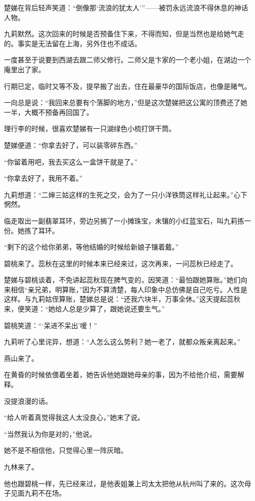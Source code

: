 \par 楚娣在背后轻声笑道：“倒像那‘流浪的犹太人’”——被罚永远流浪不得休息的神话人物。
\par 九莉默然。这次回来的时候是否预备住下来，不得而知，但是当然也是给她气走的。事实是无法留在上海，另外住也不成话。
\par 一度甚至于说要到西湖去跟二师父修行。二师父是卞家的一个老小姐，在湖边一个庵里出了家。
\par 行期已定，临时又等不及，提早搬了出去，住在最豪华的国际饭店，也像是赌气。
\par 一向总是说：“我回来总要有个落脚的地方，”但是这次楚娣把这公寓的顶费还了她一半，大概不预备再回国了。
\par 理行李的时候，很喜欢楚娣有一只湖绿色小梳打饼干筒。
\par 楚娣便道：“你拿去好了，可以装零碎东西。”
\par “你留着用吧，我去买这么一盒饼干就是了。”
\par “你拿去好了，我用不着。”
\par 九莉想道：“二婶三姑这样的生死之交，会为了一只小洋铁筒这样礼让起来。”心下惘然。
\par 临走取出一副翡翠耳环，旁边另搁了一小摊珠宝，未镶的小红蓝宝石，叫九莉拣一份。她拣了耳环。
\par “剩下的这个给你弟弟，等他结婚的时候给新娘子镶着戴。”
\par 碧桃来了。蕊秋在这里的时候本来已经来过，这次再来，一问蕊秋已经走了。
\par 楚娣与碧桃谈着，不免讲起蕊秋现在脾气变的，因笑道：“最怕跟她算账。”她们向来相信“亲兄弟，明算账，”因为不算清楚，每人印象中总仿佛是自己吃亏。人性是这样。与九莉姑侄算账，楚娣总是说：“还我六块半，万事全休。”这天提起蕊秋来，便笑道：“她给人总是少算了，跟她说还要生气。”
\par 碧桃笑道：“‘呆进不呆出’嗳！”
\par 九莉听了心里诧异，想道：“人怎么这么势利？她一老了，就都众叛亲离起来。”
\par 燕山来了。
\par 在黄昏的时候依偎着坐着，她告诉他她跟她母亲的事，因为不给他介绍，需要解释。
\par 没提浪漫的话。
\par “给人听着真觉得我这人太没良心，”她末了说。
\par “当然我认为你是对的，”他说。
\par 她不是不相信他，只觉得心里一阵灰暗。
\par 九林来了。
\par 他也跟碧桃一样，先已经来过，是他表姐兼上司太太把他从杭州叫了来的。这次母子见面九莉不在场。
